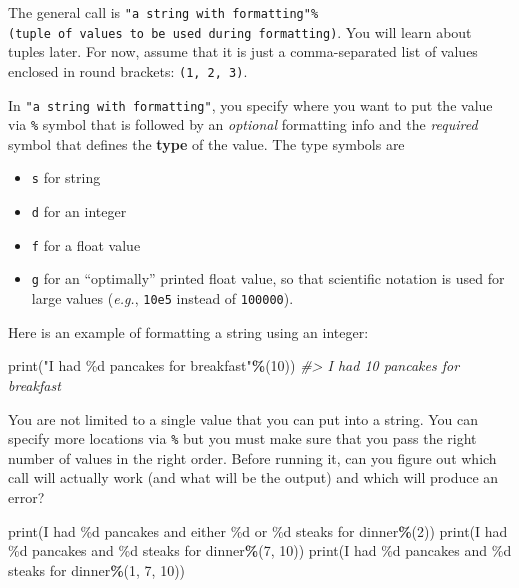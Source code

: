 \documentclass[
]{book}
\newenvironment{Shaded}{\begin{snugshade}}{\end{snugshade}}
\newcommand{\BuiltInTok}[1]{#1}
\newcommand{\CommentTok}[1]{\textcolor[rgb]{0.56,0.35,0.01}{\textit{#1}}}
\newcommand{\DecValTok}[1]{\textcolor[rgb]{0.00,0.00,0.81}{#1}}
\newcommand{\NormalTok}[1]{#1}
\newcommand{\OperatorTok}[1]{\textcolor[rgb]{0.81,0.36,0.00}{\textbf{#1}}}
\newcommand{\SpecialCharTok}[1]{\textcolor[rgb]{0.00,0.00,0.00}{#1}}
\newcommand{\StringTok}[1]{\textcolor[rgb]{0.31,0.60,0.02}{#1}}
\providecommand{\tightlist}{%
  \setlength{\itemsep}{0pt}\setlength{\parskip}{0pt}}
\begin{document}
The general call is \texttt{"a\ string\ with\ formatting"\%(tuple\ of\ values\ to\ be\ used\ during\ formatting)}. You will learn about tuples later. For now, assume that it is just a comma-separated list of values enclosed in round brackets: \texttt{(1,\ 2,\ 3)}.

In \texttt{"a\ string\ with\ formatting"}, you specify where you want to put the value via \texttt{\%} symbol that is followed by an \emph{optional} formatting info and the \emph{required} symbol that defines the \textbf{type} of the value. The type symbols are

\begin{itemize}
\tightlist
\item
  \texttt{s} for string
\item
  \texttt{d} for an integer
\item
  \texttt{f} for a float value
\item
  \texttt{g} for an ``optimally'' printed float value, so that scientific notation is used for large values (\emph{e.g.}, \texttt{10e5} instead of \texttt{100000}).
\end{itemize}

Here is an example of formatting a string using an integer:

\begin{Shaded}
\begin{Highlighting}[]
\BuiltInTok{print}\NormalTok{(}\StringTok{"I had }\SpecialCharTok{\%d}\StringTok{ pancakes for breakfast"}\OperatorTok{\%}\NormalTok{(}\DecValTok{10}\NormalTok{))}
\CommentTok{\#\textgreater{} I had 10 pancakes for breakfast}
\end{Highlighting}
\end{Shaded}

You are not limited to a single value that you can put into a string. You can specify more locations via \texttt{\%} but you must make sure that you pass the right number of values in the right order. Before running it, can you figure out which call will actually work (and what will be the output) and which will produce an error?

\begin{Shaded}
\begin{Highlighting}[]
\BuiltInTok{print}\NormalTok{(}\StringTok{\textquotesingle{}I had }\SpecialCharTok{\%d}\StringTok{ pancakes and either }\SpecialCharTok{\%d}\StringTok{  or }\SpecialCharTok{\%d}\StringTok{ steaks for dinner\textquotesingle{}}\OperatorTok{\%}\NormalTok{(}\DecValTok{2}\NormalTok{))}
\BuiltInTok{print}\NormalTok{(}\StringTok{\textquotesingle{}I had }\SpecialCharTok{\%d}\StringTok{ pancakes and }\SpecialCharTok{\%d}\StringTok{ steaks for dinner\textquotesingle{}}\OperatorTok{\%}\NormalTok{(}\DecValTok{7}\NormalTok{, }\DecValTok{10}\NormalTok{))}
\BuiltInTok{print}\NormalTok{(}\StringTok{\textquotesingle{}I had }\SpecialCharTok{\%d}\StringTok{ pancakes and }\SpecialCharTok{\%d}\StringTok{ steaks for dinner\textquotesingle{}}\OperatorTok{\%}\NormalTok{(}\DecValTok{1}\NormalTok{, }\DecValTok{7}\NormalTok{, }\DecValTok{10}\NormalTok{))}
\end{Highlighting}
\end{Shaded}
\end{document}
